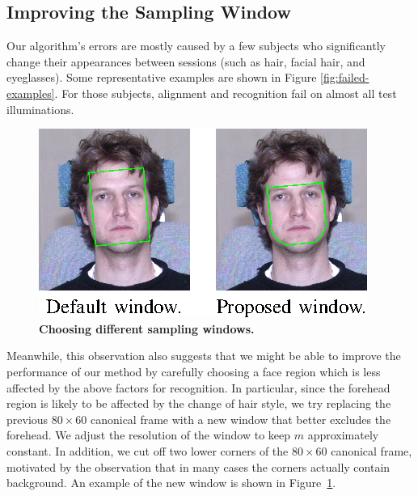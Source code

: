 \documentclass[10pt,journal,letterpaper,compsoc]{IEEEtran}
\begin{document}
\subsection{Improving the Sampling Window}
Our algorithm's errors are mostly caused by a few subjects who
significantly change their appearances between sessions (such
as hair, facial hair, and eyeglasses). Some representative
examples are shown in Figure \ref{fig:failed-examples}. For those subjects, alignment and recognition fail on
almost all test illuminations.
\begin{figure}[b]
\vspace{-1em}
\centering
\includegraphics{Figure_10}
\caption{{\bf Choosing different sampling windows.}}
\label{fig:new-mask}
\vspace{-1em}
\end{figure}
Meanwhile, this observation also suggests that we might be able
to improve the performance of our method by carefully choosing
a face region which is less affected by the above factors for
recognition. In particular, since the forehead region is likely
to be affected by the change of hair style, we try replacing
the previous $80 \times 60$ canonical frame with a new
window that better excludes the forehead. We adjust the
resolution of the window to keep $m$ approximately constant. In addition,
we cut off two lower corners of the $80 \times 60$ canonical frame, motivated by
the observation that in many cases the corners
actually contain background. An example of the new window
is shown in Figure~\ref{fig:new-mask}.
\end{document}
